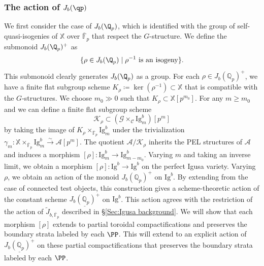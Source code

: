 \documentclass[letterpaper,11pt]{amsart}
\begin{document}


\subsubsection{The action of \texorpdfstring{$J_b(\qp)$}{}}\label{subsub: J(qp)}
We first consider the case of $J_b(\Q_p)$, which is identified with the group of self-quasi-isogenies of $\mathbb{X}$ over $\overline{\mathbb{F}}_p$ that respect the $G$-structure. We define the submonoid $J_b(\Q_p)^+$ as 
\[\{\rho\in J_b(\Q_p)\mid \rho^{-1}\ \mathrm{is}\ \mathrm{an}\ \mathrm{isogeny}\}.
\]
This submonoid clearly generates $J_b(\Q_p)$ as a group. For each $\rho\in J_b(\mathbb{Q}_p)^+$, we have a finite flat subgroup scheme $K_{\rho}\coloneq \operatorname{ker}(\rho^{-1})\subset \mathbb{X}$ that is compatible with the $G$-structures. We choose $m_0\gg 0$ such that $K_\rho\subset \mathbb{X}[p^{m_0}]$. For any $m\geq m_0$ and we can define a finite flat subgroup scheme 
\[
\mathcal{K}_{\rho}\subset \left(\mathscr{G}\times_{\mathscr{C}}\mathrm{Ig}^b_m\right)[p^m]
\]
by taking the image of $K_{\rho}\times_{\overline{\mathbb{F}}_p}\mathrm{Ig}^b_m$ under the trivialization $\gamma_m: \mathbb{X}\times_{\overline{\mathbb{F}}_p}\mathrm{Ig}^b_m \stackrel{\sim}{\to} \mathcal{A}[p^m]$. The quotient $\mathcal{A}/\mathcal{K}_{\rho}$ inherits the PEL structures of $\mathcal{A}$ and induces a morphism $[\rho]:\mathrm{Ig}^b_m\to \mathrm{Ig}^b_{m-m_0}$. Varying $m$ and taking an inverse limit, we obtain a morphism 
$[\rho]: \mathrm{Ig}^b\to \mathrm{Ig}^b$ on the perfect Igusa variety. Varying $\rho$, we obtain an action of the monoid $J_b(\mathbb{Q}_p)^+$ on $\mathrm{Ig}^b$. By extending from the case of connected test objects, this construction gives a scheme-theoretic action of the constant scheme $\underline{J_b(\mathbb{Q}_p)^+}$ on $\mathrm{Ig}^b$. This action agrees with the restriction of the action of $\widetilde{J}_{b, \overline{\mathbb{F}}_p}$ described in \S\ref{Sec:Igusa background}. We will show that each morphism $[\rho]$ extends to partial toroidal compactifications and preserves the boundary strata labeled by each $\PP$. This will extend to an explicit action of $\underline{J_b(\mathbb{Q}_p)^+}$ on these partial compactifications that preserves the boundary strata labeled by each $\PP$. 
\end{document}
